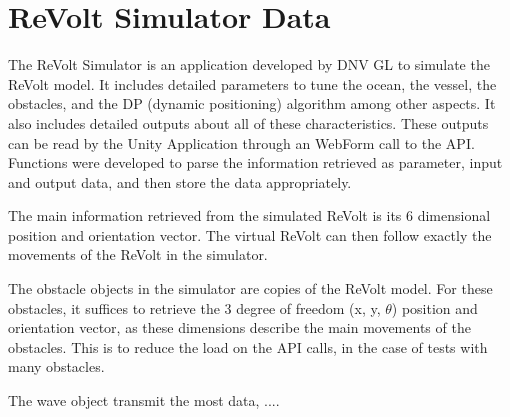 \chapter{ReVolt Simulator Data}
The ReVolt Simulator is an application developed by DNV GL to simulate the ReVolt model. It includes detailed parameters to tune the ocean, the vessel, the obstacles, and the DP (dynamic positioning) algorithm among other aspects. It also includes detailed outputs about all of these characteristics. These outputs can be read by the Unity Application through an WebForm call to the API. Functions were developed to parse the information retrieved as parameter, input and output data, and then store the data appropriately.

The main information retrieved from the simulated ReVolt is its 6 dimensional position and orientation vector. The virtual ReVolt can then follow exactly the movements of the ReVolt in the simulator.

The obstacle objects in the simulator are copies of the ReVolt model. For these obstacles, it suffices to retrieve the 3 degree of freedom (x, y, $\theta$) position and orientation vector, as these dimensions describe the main movements of the obstacles. This is to reduce the load on the API calls, in the case of tests with many obstacles.

The wave object transmit the most data, ....
